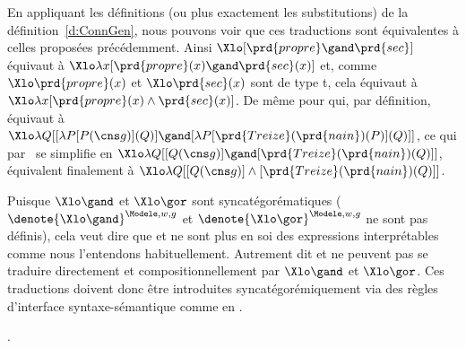 \sloppy
En appliquant les définitions (ou plus exactement les substitutions) de la définition~\ref{d:ConnGen}, nous pouvons voir que ces traductions sont équivalentes à celles proposées précédemment.  Ainsi $\Xlo[\prd{propre}\gand\prd{sec}]$ équivaut à $\Xlo\lambda x [\prd{propre}(x)\gand\prd{sec}(x)]$ et, comme $\Xlo\prd{propre}(x)$ et $\Xlo\prd{sec}(x)$ sont de type \typ t, cela équivaut à $\Xlo\lambda x [\prd{propre}(x)\wedge\prd{sec}(x)]$.  
De même pour \Last[b] qui, par définition, équivaut à $\Xlo\lambda Q[[\lambda P[P(\cns g)](Q)]\gand[\lambda P[\prd{Treize}(\prd{nain})(P)](Q)]]$, ce qui par \breduc\ se simplifie en
$\Xlo\lambda Q[[Q(\cns g)]\gand[\prd{Treize}(\prd{nain})(Q)]]$, équivalent finalement à $\Xlo\lambda Q[[Q(\cns g)]\wedge[\prd{Treize}(\prd{nain})(Q)]]$.

\fussy

Puisque $\Xlo\gand$ et $\Xlo\gor$ sont syncatégorématiques ($\denote{\Xlo\gand}^{\Modele,w,g}$ et $\denote{\Xlo\gor}^{\Modele,w,g}$ ne sont pas définis), cela veut dire que   et  ne sont plus en soi  des expressions interprétables comme nous l'entendons habituellement. Autrement dit  et   ne peuvent pas se traduire directement et compositionnellement par $\Xlo\gand$ et $\Xlo\gor$.  Ces traductions doivent donc être introduites syncatégorémiquement via des règles d'interface syntaxe-sémantique comme en \Next.

\ex.
\quad
{}


